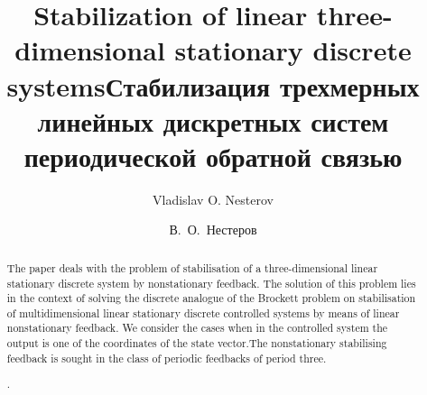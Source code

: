 \begin{englishtitle}
\title{Stabilization of linear three-dimensional stationary discrete systems}
\author{Vladislav O. Nesterov}

\maketitle

\begin{abstract}
The paper deals with the  problem of stabilisation of a three-dimensional linear stationary discrete system by nonstationary feedback. The solution of this problem lies in the context of solving the discrete analogue of the Brockett problem on stabilisation of multidimensional linear stationary discrete controlled systems by means of linear nonstationary feedback. We consider the cases when in the controlled system the output is one of the coordinates of the state vector.The nonstationary stabilising feedback is sought in the class of periodic feedbacks of period three.

.
\end{abstract}
\end{englishtitle}

\iffalse
\documentclass[12pt]{llncs}
\usepackage[T2A]{fontenc}
\usepackage[utf8]{inputenc}
\usepackage[english,russian]{babel}
\usepackage[russian]{nla}




\fi

\title{Стабилизация трехмерных линейных дискретных систем периодической обратной связью}
\author{В.~О.~Нестеров%
} 



